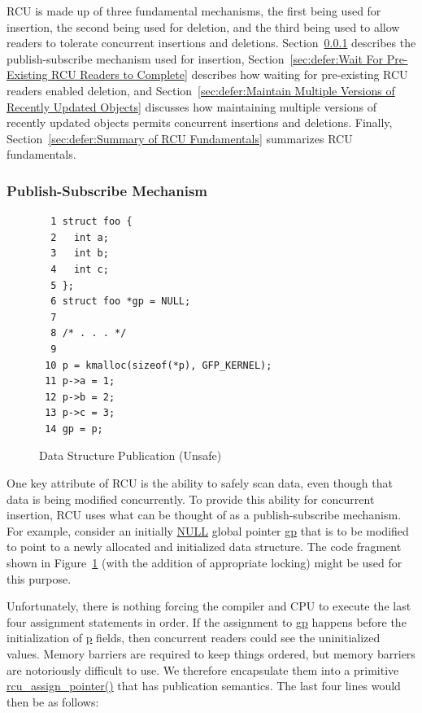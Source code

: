 RCU is made up of three fundamental mechanisms, the first being
used for insertion, the second being used for deletion, and the third
being used to allow readers to tolerate concurrent insertions and deletions.
Section~\ref{sec:defer:Publish-Subscribe Mechanism}
describes the publish-subscribe mechanism used for insertion,
Section~\ref{sec:defer:Wait For Pre-Existing RCU Readers to Complete}
describes how waiting for pre-existing RCU readers enabled deletion,
and
Section~\ref{sec:defer:Maintain Multiple Versions of Recently Updated Objects}
discusses how maintaining multiple versions of recently updated objects
permits concurrent insertions and deletions.
Finally,
Section~\ref{sec:defer:Summary of RCU Fundamentals}
summarizes RCU fundamentals.

\subsubsection{Publish-Subscribe Mechanism}
\label{sec:defer:Publish-Subscribe Mechanism}

\begin{figure}[tbp]
{ \scriptsize
\begin{verbatim}
  1 struct foo {
  2   int a;
  3   int b;
  4   int c;
  5 };
  6 struct foo *gp = NULL;
  7
  8 /* . . . */
  9
 10 p = kmalloc(sizeof(*p), GFP_KERNEL);
 11 p->a = 1;
 12 p->b = 2;
 13 p->c = 3;
 14 gp = p;
\end{verbatim}
}
\caption{Data Structure Publication (Unsafe)}
\label{fig:defer:Data Structure Publication (Unsafe)}
\end{figure}

One key attribute of RCU is the ability to safely scan data, even
though that data is being modified concurrently.
To provide this ability for concurrent insertion,
RCU uses what can be thought of as a publish-subscribe mechanism.
For example, consider an initially \url{NULL} global pointer
\url{gp} that is to be modified to point to a newly allocated
and initialized data structure.
The code fragment shown in
Figure~\ref{fig:defer:Data Structure Publication (Unsafe)}
(with the addition of appropriate locking)
might be used for this purpose.

Unfortunately, there is nothing forcing the compiler and CPU to execute
the last four assignment statements in order.
If the assignment to \url{gp} happens before the initialization
of \url{p} fields, then concurrent readers could see the
uninitialized values.
Memory barriers are required to keep things ordered, but memory barriers
are notoriously difficult to use.
We therefore encapsulate them into a primitive
\url{rcu_assign_pointer()} that has publication semantics.
The last four lines would then be as follows:

